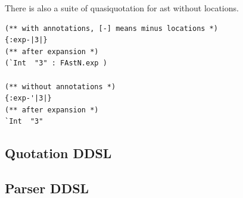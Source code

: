 \documentclass[11pt]{article}
\begin{document}
\begin{enumerate}
There is also a suite of quasiquotation for ast without locations.

\begin{verbatim}
(** with annotations, [-] means minus locations *)
{:exp-|3|}
(** after expansion *)
(`Int  "3" : FAstN.exp )

(** without annotations *)
{:exp-'|3|}
(** after expansion *)
`Int  "3"
\end{verbatim}
\end{enumerate}
\subsection{Quotation DDSL}
\label{sec-5-2}

\subsection{Parser DDSL}
\label{sec-5-3}
\end{document}
